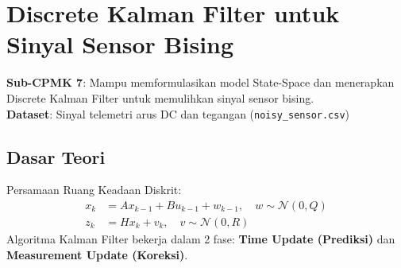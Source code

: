 \documentclass[11pt,a4paper]{report}
\begin{document}
\newpage

\chapter{Discrete Kalman Filter untuk Sinyal Sensor Bising}

\begin{tcolorbox}[title=Informasi Modul 7]
\textbf{Sub-CPMK 7}: Mampu memformulasikan model State-Space dan menerapkan Discrete Kalman Filter untuk memulihkan sinyal sensor bising.\\
\textbf{Dataset}: Sinyal telemetri arus DC dan tegangan (\texttt{noisy\_sensor.csv})
\end{tcolorbox}

\section{Dasar Teori}
Persamaan Ruang Keadaan Diskrit:
\begin{align}
    x_k &= A x_{k-1} + B u_{k-1} + w_{k-1}, \quad w \sim \mathcal{N}(0, Q) \\
    z_k &= H x_k + v_k, \quad v \sim \mathcal{N}(0, R)
\end{align}
Algoritma Kalman Filter bekerja dalam 2 fase: \textbf{Time Update (Prediksi)} dan \textbf{Measurement Update (Koreksi)}.
\end{document}
